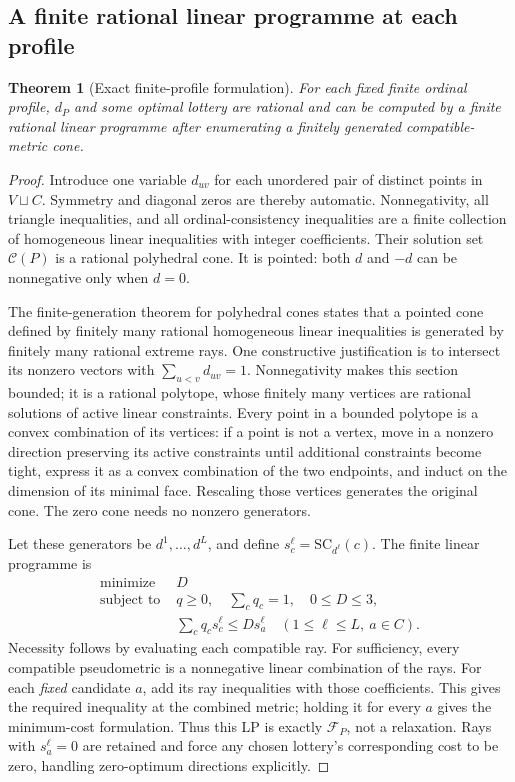 \documentclass[11pt,a4paper]{article}
\newtheorem{theorem}{Theorem}[section]
\theoremstyle{definition}
\theoremstyle{remark}
\begin{document}
\subsection{A finite rational linear programme at each profile}
\begin{theorem}[Exact finite-profile formulation]
For each fixed finite ordinal profile, $d_P$ and some optimal lottery are rational and can be computed by a finite rational linear programme after enumerating a finitely generated compatible-metric cone.
\end{theorem}
\begin{proof}
Introduce one variable $d_{uv}$ for each unordered pair of distinct points in $V\sqcup C$. Symmetry and diagonal zeros are thereby automatic. Nonnegativity, all triangle inequalities, and all ordinal-consistency inequalities are a finite collection of homogeneous linear inequalities with integer coefficients. Their solution set $\mathcal C(P)$ is a rational polyhedral cone. It is pointed: both $d$ and $-d$ can be nonnegative only when $d=0$.

The finite-generation theorem for polyhedral cones states that a pointed cone defined by finitely many rational homogeneous linear inequalities is generated by finitely many rational extreme rays. One constructive justification is to intersect its nonzero vectors with $\sum_{u<v}d_{uv}=1$. Nonnegativity makes this section bounded; it is a rational polytope, whose finitely many vertices are rational solutions of active linear constraints. Every point in a bounded polytope is a convex combination of its vertices: if a point is not a vertex, move in a nonzero direction preserving its active constraints until additional constraints become tight, express it as a convex combination of the two endpoints, and induct on the dimension of its minimal face. Rescaling those vertices generates the original cone. The zero cone needs no nonzero generators.

Let these generators be $d^1,\ldots,d^L$, and define $s_c^\ell=\mathrm{SC}_{d^\ell}(c)$. The finite linear programme is
\begin{align*}
 \text{minimize }&D\\
 \text{subject to }&q\geq0,\quad\sum_cq_c=1,\quad0\leq D\leq3,\\
 &\sum_cq_cs_c^\ell\leq D s_a^\ell
       \quad(1\leq\ell\leq L,\ a\in C).
\end{align*}
Necessity follows by evaluating each compatible ray. For sufficiency, every compatible pseudometric is a nonnegative linear combination of the rays. For each \emph{fixed} candidate $a$, add its ray inequalities with those coefficients. This gives the required inequality at the combined metric; holding it for every $a$ gives the minimum-cost formulation. Thus this LP is exactly $\mathcal F_P$, not a relaxation. Rays with $s_a^\ell=0$ are retained and force any chosen lottery's corresponding cost to be zero, handling zero-optimum directions explicitly.


\end{proof}
\end{document}
